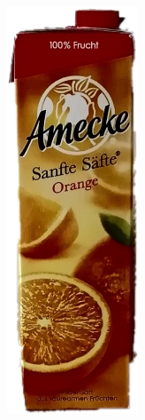 \begin{appendices}
\begin{figure}[htb]
\begin{minipage}[c]{0.08\textwidth}
\includegraphics[width=\textwidth]{Sources/Bild1_HA.png}

\end{minipage}
\end{figure}
\end{appendices}
